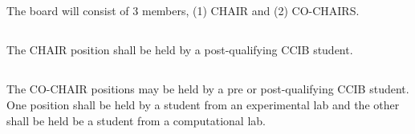 \subsection{}

The board will consist of 3 members, (1) CHAIR and (2) CO-CHAIRS. 

\subsection{}

The CHAIR position shall be held by a post-qualifying CCIB student.

\subsection{}

The CO-CHAIR positions may be held by a pre or post-qualifying CCIB student.  One position shall be held by a student from an experimental lab and the other shall be held be a student from a computational lab. 